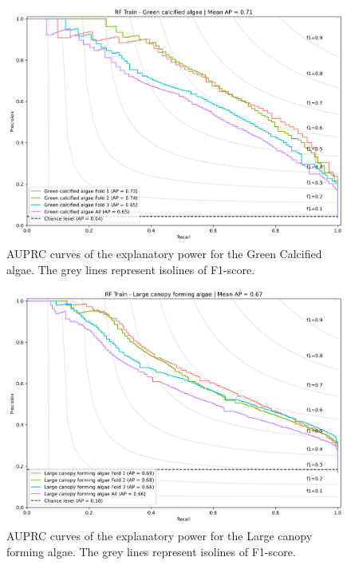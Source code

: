 \begin{figure}
\hypertarget{fig:chap3figS28}{%
\centering
\includegraphics{03-Chapitre3/figures/supplementary/03-precision_recall_curve_train_rf_Green calcified algae.png}
\caption{AUPRC curves of the explanatory power for the Green Calcified
algae. The grey lines represent isolines of
F1-score.}\label{fig:chap3figS28}
}
\end{figure}

\begin{figure}
\hypertarget{fig:chap3figS29}{%
\centering
\includegraphics{03-Chapitre3/figures/supplementary/03-precision_recall_curve_train_rf_Large canopy forming algae.png}
\caption{AUPRC curves of the explanatory power for the Large canopy
forming algae. The grey lines represent isolines of
F1-score.}\label{fig:chap3figS29}
}
\end{figure}

